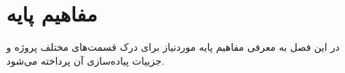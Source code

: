 \chapter{مفاهیم پایه}
در این فصل به معرفی مفاهیم پایه موردنیاز برای درک قسمت‌های مختلف پروژه و جزییات پیاده‌سازی آن پرداخته می‌شود.



\newpage



\newpage

